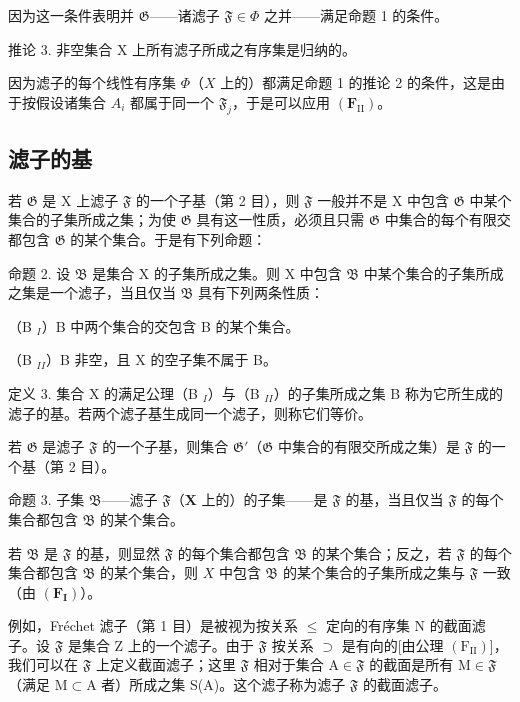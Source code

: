 因为这一条件表明并 \(\mathfrak{G}\)——诸滤子 \(\mathfrak{F} \in \Phi\) 之并——满足命题 1 的条件。

推论 3. 非空集合 X 上所有滤子所成之有序集是归纳的。

因为滤子的每个线性有序集 \(\Phi\)（\(X\) 上的）都满足命题 1 的推论 2 的条件，这是由于按假设诸集合 \(A_{i}\) 都属于同一个 \(\mathfrak{F}_{j}\)，于是可以应用 \((\mathbf{F}_{\mathrm{II}})\)。

\subsection{滤子的基}

若 \(\mathfrak{G}\) 是 X 上滤子 \(\mathfrak{F}\) 的一个子基（第 2 目），则 \(\mathfrak{F}\) 一般并不是 X 中包含 \(\mathfrak{G}\) 中某个集合的子集所成之集；为使 \(\mathfrak{G}\) 具有这一性质，必须且只需 \(\mathfrak{G}\) 中集合的每个有限交都包含 \(\mathfrak{G}\) 的某个集合。于是有下列命题：

命题 2. 设 \(\mathfrak{B}\) 是集合 X 的子集所成之集。则 X 中包含 \(\mathfrak{B}\) 中某个集合的子集所成之集是一个滤子，当且仅当 \(\mathfrak{B}\) 具有下列两条性质：

（B \(_{I}\)）B 中两个集合的交包含 B 的某个集合。

（B \(_{II}\)）B 非空，且 X 的空子集不属于 B。

定义 3. 集合 X 的满足公理（B \(_{I}\)）与（B \(_{II}\)）的子集所成之集 B 称为它所生成的滤子的基。若两个滤子基生成同一个滤子，则称它们等价。

若 \(\mathfrak{G}\) 是滤子 \(\mathfrak{F}\) 的一个子基，则集合 \(\mathfrak{G}'\)（\(\mathfrak{G}\) 中集合的有限交所成之集）是 \(\mathfrak{F}\) 的一个基（第 2 目）。

命题 3. 子集 \(\mathfrak{B}\)——滤子 \(\mathfrak{F}\)（\(\mathbf{X}\) 上的）的子集——是 \(\mathfrak{F}\) 的基，当且仅当 \(\mathfrak{F}\) 的每个集合都包含 \(\mathfrak{B}\) 的某个集合。

若 \(\mathfrak{B}\) 是 \(\mathfrak{F}\) 的基，则显然 \(\mathfrak{F}\) 的每个集合都包含 \(\mathfrak{B}\) 的某个集合；反之，若 \(\mathfrak{F}\) 的每个集合都包含 \(\mathfrak{B}\) 的某个集合，则 \(X\) 中包含 \(\mathfrak{B}\) 的某个集合的子集所成之集与 \(\mathfrak{F}\) 一致（由 \((\mathbf{F}_{\mathbf{I}})\)）。

例如，Fréchet 滤子（第 1 目）是被视为按关系 \(\leqslant\) 定向的有序集 N 的截面滤子。设 \(\mathfrak{F}\) 是集合 Z 上的一个滤子。由于 \(\mathfrak{F}\) 按关系 \(\supset\) 是有向的{[}由公理 \((\mathrm{F}_{\mathrm{II}})\){]}，我们可以在 \(\mathfrak{F}\) 上定义截面滤子；这里 \(\mathfrak{F}\) 相对于集合 A\(\in\mathfrak{F}\) 的截面是所有 M\(\in\mathfrak{F}\)（满足 M\(\subset\)A 者）所成之集 S(A)。这个滤子称为滤子 \(\mathfrak{F}\) 的截面滤子。

